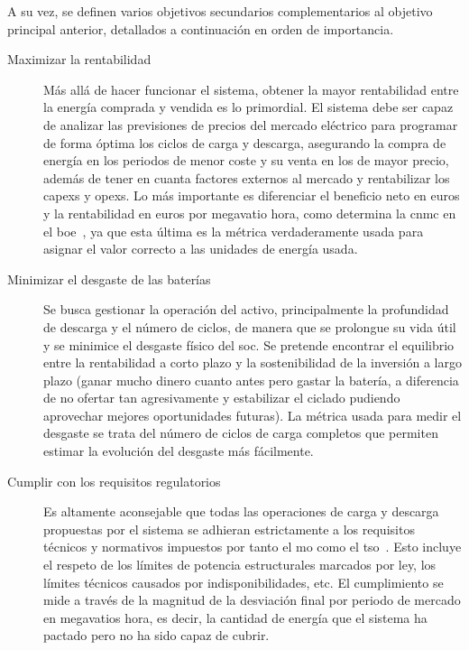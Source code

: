 A su vez, se definen varios objetivos secundarios complementarios al objetivo principal anterior, detallados a continuación en orden de importancia.

\begin{description}

  \item[Maximizar la rentabilidad] Más allá de hacer funcionar el sistema, obtener la mayor rentabilidad entre la energía comprada y vendida es lo primordial. El sistema debe ser capaz de analizar las previsiones de precios del mercado eléctrico para programar de forma óptima los ciclos de carga y descarga, asegurando la compra de energía en los periodos de menor coste y su venta en los de mayor precio, además de tener en cuanta factores externos al mercado y rentabilizar los \glspl{capex} y \glspl{opex}. Lo más importante es diferenciar el beneficio neto en euros y la rentabilidad en euros por megavatio hora, como determina la \gls{cnmc} en el \gls{boe}~\cite{cnmc2025resolucion}, ya que esta última es la métrica verdaderamente usada para asignar el valor correcto a las unidades de energía usada.

  \item[Minimizar el desgaste de las baterías] Se busca gestionar la operación del activo, principalmente la profundidad de descarga y el número de ciclos, de manera que se prolongue su vida útil y se minimice el desgaste físico del \gls{soc}. Se pretende encontrar el equilibrio entre la rentabilidad a corto plazo y la sostenibilidad de la inversión a largo plazo (ganar mucho dinero cuanto antes pero gastar la batería, a diferencia de no ofertar tan agresivamente y estabilizar el ciclado pudiendo aprovechar mejores oportunidades futuras). La métrica usada para medir el desgaste se trata del número de ciclos de carga completos que permiten estimar la evolución del desgaste más fácilmente.

  \item[Cumplir con los requisitos regulatorios] Es altamente aconsejable que todas las operaciones de carga y descarga propuestas por el sistema se adhieran estrictamente a los requisitos técnicos y normativos impuestos por tanto el \gls{mo} como el \gls{tso}~\cite{crespo2004resolucion}. Esto incluye el respeto de los límites de potencia estructurales marcados por ley, los límites técnicos causados por indisponibilidades, etc. El cumplimiento se mide a través de la magnitud de la desviación final por periodo de mercado en megavatios hora, es decir, la cantidad de energía que el sistema ha pactado pero no ha sido capaz de cubrir.


\end{description}
